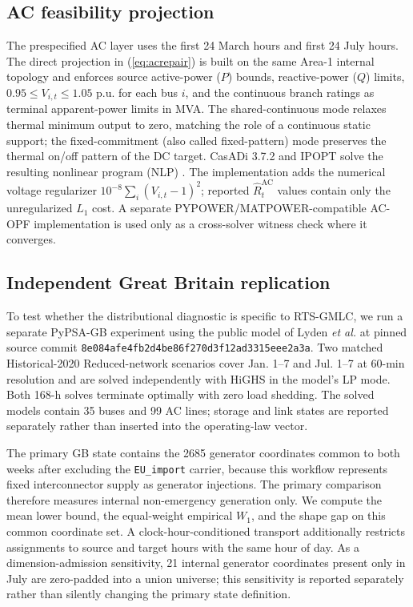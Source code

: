 \documentclass[journal]{IEEEtran}
\begin{document}
\subsection{AC feasibility projection}
The prespecified AC layer uses the first 24 March hours and first 24 July hours. The direct projection in (\ref{eq:acrepair}) is built on the same Area-1 internal topology and enforces source active-power ($P$) bounds, reactive-power ($Q$) limits, $0.95\le V_{i,t}\le1.05$ p.u. for each bus $i$, and the continuous branch ratings as terminal apparent-power limits in MVA. The shared-continuous mode relaxes thermal minimum output to zero, matching the role of a continuous static support; the fixed-commitment (also called fixed-pattern) mode preserves the thermal on/off pattern of the DC target. CasADi 3.7.2 and IPOPT solve the resulting nonlinear program (NLP) \cite{Andersson2019,Wachter2006}. The implementation adds the numerical voltage regularizer $10^{-8}\sum_i(V_{i,t}-1)^2$; reported $\widehat R_t^{\mathrm{AC}}$ values contain only the unregularized $L_1$ cost. A separate PYPOWER/MATPOWER-compatible AC-OPF implementation \cite{Zimmerman2011} is used only as a cross-solver witness check where it converges.

\subsection{Independent Great Britain replication}
To test whether the distributional diagnostic is specific to RTS-GMLC, we run a separate PyPSA-GB experiment using the public model of Lyden \emph{et al.} \cite{Lyden2024} at pinned source commit \texttt{8e084afe4fb2d4be86f270d3f12ad3315eee2a3a}. Two matched Historical-2020 Reduced-network scenarios cover Jan. 1--7 and Jul. 1--7 at 60-min resolution and are solved independently with HiGHS in the model's LP mode. Both 168-h solves terminate optimally with zero load shedding. The solved models contain 35 buses and 99 AC lines; storage and link states are reported separately rather than inserted into the operating-law vector.

The primary GB state contains the 2685 generator coordinates common to both weeks after excluding the \texttt{EU\_import} carrier, because this workflow represents fixed interconnector supply as generator injections. The primary comparison therefore measures internal non-emergency generation only. We compute the mean lower bound, the equal-weight empirical $W_1$, and the shape gap on this common coordinate set. A clock-hour-conditioned transport additionally restricts assignments to source and target hours with the same hour of day. As a dimension-admission sensitivity, 21 internal generator coordinates present only in July are zero-padded into a union universe; this sensitivity is reported separately rather than silently changing the primary state definition.
\end{document}
